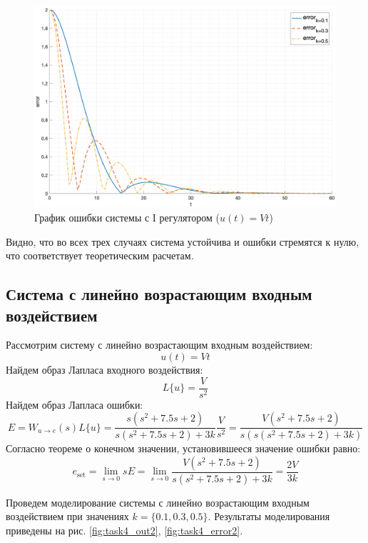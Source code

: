 \begin{figure}[ht!]
    \centering
    \includegraphics[width=\textwidth]{"media/plots/task4_error1.png"}
    \caption{График ошибки системы с I регулятором ($u(t) = Vt$)}
    \label{fig:task4_error}
\end{figure}


Видно, что во всех трех случаях система устойчива и ошибки стремятся к нулю, что соответствует теоретическим расчетам.

\subsection{Система с линейно возрастающим входным воздействием}
Рассмотрим систему с линейно возрастающим входным воздействием:
\begin{equation}
    u(t) = Vt
\end{equation}
Найдем образ Лапласа входного воздействия:
\begin{equation}
    L\{u\} = \frac{V}{s^2}
\end{equation}
Найдем образ Лапласа ошибки:
\begin{equation}
    E = W_{u\rightarrow e}(s)L\{u\} = \frac{s(s^2 + 7.5s + 2)}{s(s^2 + 7.5s + 2) + 3k}\frac{V}{s^2} = \frac{V(s^2 + 7.5s + 2)}{s(s(s^2 + 7.5s + 2) + 3k)}
\end{equation}
Согласно теореме о конечном значении, установившееся значение ошибки равно:
\begin{equation}
    e_{\text{set}} = \lim_{s \to 0} sE = \lim_{s \to 0} \frac{V(s^2 + 7.5s + 2)}{s(s^2 + 7.5s + 2) + 3k} = \frac{2V}{3k}
\end{equation}

Проведем моделирование системы с линейно возрастающим входным воздействием при значениях $k = \{0.1, 0.3, 0.5\}$.
Результаты моделирования приведены на рис. \ref{fig:task4_out2}, \ref{fig:task4_error2}.

